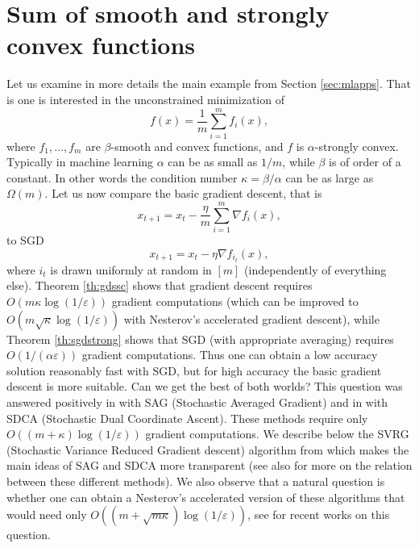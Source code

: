 \documentclass[openany]{now}
\renewcommand{\epsilon}{\varepsilon}
\begin{document}
\section{Sum of smooth and strongly convex functions}
Let us examine in more details the main example from Section \ref{sec:mlapps}. That is one is interested in the unconstrained minimization of 
$$f(x) = \frac1{m} \sum_{i=1}^m f_i(x) ,$$
where $f_1, \hdots, f_m$ are $\beta$-smooth and convex functions, and $f$ is $\alpha$-strongly convex. Typically in machine learning $\alpha$ can be as small as $1/m$, while $\beta$ is of order of a constant. In other words the condition number $\kappa= \beta / \alpha$ can be as large as $\Omega(m)$. Let us now compare the basic gradient descent, that is
$$x_{t+1} = x_t - \frac{\eta}{m} \sum_{i=1}^m \nabla f_i(x) ,$$
to SGD
$$x_{t+1} = x_t - \eta \nabla f_{i_t}(x) ,$$
where $i_t$ is drawn uniformly at random in $[m]$ (independently of everything else). Theorem \ref{th:gdssc} shows that gradient descent requires $O(m \kappa \log(1/\epsilon))$ gradient computations (which can be improved to $O(m \sqrt{\kappa} \log(1/\epsilon))$ with Nesterov's accelerated gradient descent), while Theorem \ref{th:sgdstrong} shows that SGD (with appropriate averaging) requires $O(1/ (\alpha \epsilon))$ gradient computations. Thus one can obtain a low accuracy solution reasonably fast with SGD, but for high accuracy the basic gradient descent is more suitable. Can we get the best of both worlds? This question was answered positively in \cite{LRSB12} with SAG (Stochastic Averaged Gradient) and in \cite{SSZ13} with SDCA (Stochastic Dual Coordinate Ascent). These methods require only $O((m+\kappa) \log(1/\epsilon))$ gradient computations. We describe below the SVRG (Stochastic Variance Reduced Gradient descent) algorithm from \cite{JZ13} which makes the main ideas of SAG and SDCA more transparent (see also \cite{DBLJ14} for more on the relation between these different methods). We also observe that a natural question is whether one can obtain a Nesterov's accelerated version of these algorithms that would need only $O((m + \sqrt{m \kappa}) \log(1/\epsilon))$, see \cite{SSZ13b, ZX14, AB14} for recent works on this question.
\end{document}
